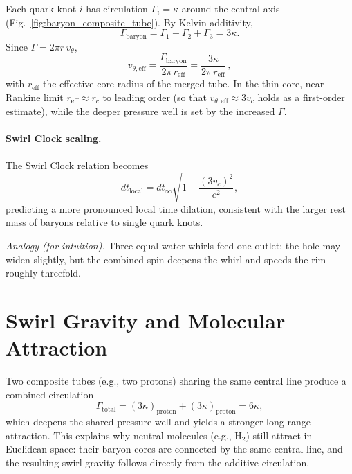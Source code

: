 \documentclass[reprint,aps,onecolumn,nofootinbib]{revtex4-2}
\begin{document}
    Each quark knot $i$ has circulation $\Gamma_i = \kappa$ around the central axis (Fig.~\ref{fig:baryon_composite_tube}).
        By Kelvin additivity,
        \begin{equation}
            \Gamma_{\mathrm{baryon}}=\Gamma_1+\Gamma_2+\Gamma_3=3\kappa.
        \end{equation}
        Since $\Gamma=2\pi r\,v_\theta$,
        \begin{equation}
            \boxed{\;
            v_{\theta,\mathrm{eff}}=\frac{\Gamma_{\mathrm{baryon}}}{2\pi\,r_{\mathrm{eff}}}
                =\frac{3\kappa}{2\pi\,r_{\mathrm{eff}}}\,,
                \;}\label{eq:baryon-vtheta}
        \end{equation}
        with $r_{\mathrm{eff}}$ the effective core radius of the merged tube. In the thin-core, near-Rankine limit $r_{\mathrm{eff}}\approx r_c$ to leading order (so that $v_{\theta,\mathrm{eff}}\approx 3 v_c$ holds as a first-order estimate), while the deeper pressure well is set by the increased $\Gamma$.

        \paragraph{Swirl Clock scaling.}
        The Swirl Clock relation becomes
        \begin{equation}
            dt_{\mathrm{local}} = dt_\infty \sqrt{1 - \frac{(3 v_c)^2}{c^2}},\label{eq:baryon-swirl-clock}
        \end{equation}
        predicting a more pronounced local time dilation, consistent with the larger rest mass of baryons relative to single quark knots.

            \emph{Analogy (for intuition).} Three equal water whirls feed one outlet: the hole may widen slightly, but the combined spin deepens the whirl and speeds the rim roughly threefold.





\section{Swirl Gravity and Molecular Attraction}
    Two composite tubes (e.g., two protons) sharing the same central line produce a combined circulation
    \[
        \Gamma_{\mathrm{total}} = (3 \kappa)_{\mathrm{proton}} + (3 \kappa)_{\mathrm{proton}} = 6 \kappa,
    \]
    which deepens the shared pressure well and yields a stronger long-range attraction.
    This explains why neutral molecules (e.g., H$_2$) still attract in Euclidean space: their baryon cores are connected by the same central line, and the resulting swirl gravity follows directly from the additive circulation.
\end{document}
